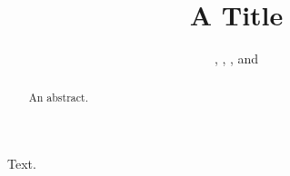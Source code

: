 \documentclass{ptephy}
\begin{document}
\title{A Title}
\author{, , , and }
\address{
, {\dag}cy@example.org}
\begin{abstract}An abstract.\end{abstract}
\maketitle
Text.
\end{document}
